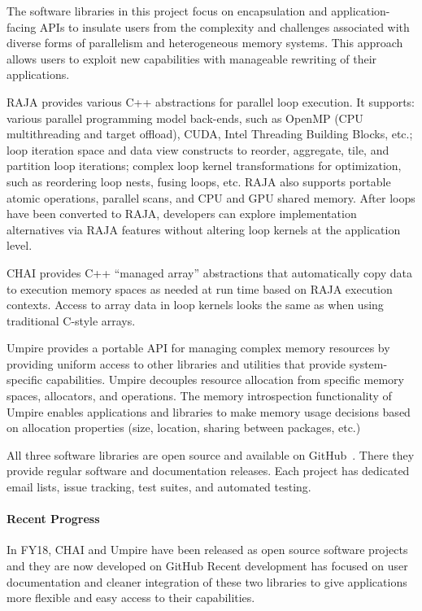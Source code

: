 The software libraries in this project focus on encapsulation and 
application-facing APIs to insulate users from the complexity and 
challenges associated with diverse forms of parallelism and heterogeneous 
memory systems. This approach allows users to exploit new capabilities 
with manageable rewriting of their applications.

RAJA provides various C++ abstractions for parallel loop execution. It
supports: various parallel programming model back-ends, such as OpenMP 
(CPU multithreading and target offload), CUDA, Intel Threading Building Blocks,
etc.; loop iteration space and data view constructs to reorder, 
aggregate, tile, and partition loop iterations; complex loop kernel 
transformations for optimization, such as reordering loop nests, fusing 
loops, etc. RAJA also supports portable atomic operations, parallel scans, 
and CPU and GPU shared memory. After loops have been converted to RAJA, 
developers can explore implementation alternatives via RAJA features without 
altering loop kernels at the application level.

CHAI provides C++ ``managed array'' abstractions that automatically copy 
data to execution memory spaces as needed at run time based on RAJA execution 
contexts. Access to array data in loop kernels looks the same as when using
traditional C-style arrays.

Umpire provides a portable API for managing complex memory resources by 
providing uniform access to other libraries and utilities that provide
system-specific capabilities. Umpire decouples resource allocation from 
specific memory spaces, allocators, and operations. The memory introspection 
functionality of Umpire enables applications and libraries to make memory 
usage decisions based on allocation properties (size, location, sharing 
between packages, etc.)

All three software libraries are open source and 
available on GitHub~\cite{RAJA-github, CHAI-github, Umpire-github}. There they 
provide regular software and documentation releases. Each project has 
dedicated email lists, issue tracking, test suites, and automated testing.

\paragraph{Recent Progress}

In FY18, CHAI and Umpire have been released as open source software projects
and they are now developed on GitHub Recent development has focused on 
user documentation and cleaner integration of these two libraries to give 
applications more flexible and easy access to their capabilities.

